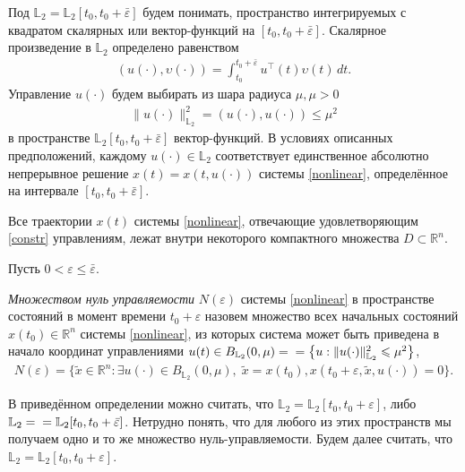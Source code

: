 Под $ \mathbb{L}_2 = \mathbb{L}_2[t_0,t_0+\bar{\varepsilon}]  $ будем понимать,   пространство интегрируемых с квадратом скалярных или вектор-функций  на $ [t_0,t_0+\bar{\varepsilon}] $.  Скалярное произведение в $ \mathbb{L}_2 $ определено равенством
\begin{gather*}
	\left(u(\cdot),\upsilon(\cdot) \right) = \int_{t_0}^{t_0+\bar{\varepsilon}}u^{\top}(t)\upsilon(t) \, dt.
\end{gather*}
 Управление $ u(\cdot) $ будем выбирать из шара радиуса $ \mu, \mu > 0 $
\begin{gather}\label{constr}
	\lVert u(\cdot)\rVert^2_{\mathbb{L}_2} = \left(u(\cdot),u(\cdot) \right) \leqslant \mu^2
\end{gather}
в пространстве $\mathbb{L}_2[t_0,t_0+\bar{\varepsilon}]$ вектор-функций.
В условиях описанных предположений, каждому $ u(\cdot) \in \mathbb{L}_2 $ соответствует единственное абсолютно непрерывное решение $ x(t)=x(t,u(\cdot)) $ системы \eqref{nonlinear}, определённое на интервале $ [t_0,t_0+\bar{\varepsilon}] $.

Все траектории $ x(t) $ системы \eqref{nonlinear}, отвечающие удовлетворяющим \eqref{constr} управлениям,  лежат внутри некоторого компактного множества $ D \subset \mathbb{R}^n $.

Пусть $ 0 <  \varepsilon \leqslant \bar{\varepsilon} $.
\begin{df}
	{\it Множеством нуль управляемости} $ N(\varepsilon) $ системы \eqref{nonlinear} в пространстве состояний в момент времени $ t_0 + \varepsilon $ назовем
	множество всех начальных состояний $ x(t_0) \in \mathbb{R}^n $ системы \eqref{nonlinear},  из которых система может быть приведена в начало координат управлениями
	$ u(t) \in B_{\mathbb{L}_2}(0,\mu) =\\ =\left\lbrace u:\lVert u(\cdot)\rVert^2_{\mathbb{L}_2} \leqslant \mu^2\right\rbrace  $,
	\begin{gather*}
		N(\varepsilon)=\{\widetilde{x}\in \mathbb{R}^n:\exists u(\cdot)\in B_{\mathbb{L}_2}(0,\mu),\; \widetilde{x}=x(t_0) , x(t_0 + \varepsilon,\widetilde{x},u(\cdot)) = 0\}.
	\end{gather*}
\end{df}

В приведённом определении можно считать, что $ \mathbb{L}_2 =\mathbb{L}_2[t_0,t_0+\varepsilon] $, либо  $ \mathbb{L}_2 =\\=\mathbb{L}_2[t_0,t_0+\bar{\varepsilon}] $. Нетрудно понять, что для любого из этих пространств мы получаем одно и то же множество нуль-управляемости. Будем далее считать, что $ \mathbb{L}_2 =\mathbb{L}_2[t_0,t_0+\varepsilon] $.

